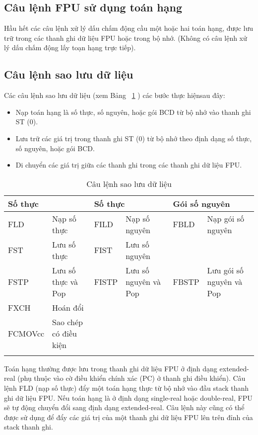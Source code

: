 		\subsection*{Câu lệnh FPU sử dụng toán hạng}
		Hầu hết các câu lệnh xử lý dấu chấm động cầu một hoặc hai toán hạng, được lưu trữ trong các thanh ghi dữ liệu FPU hoặc trong bộ nhớ. (Không có câu lệnh xử lý dấu chấm động lấy toạn hạng trực tiếp).
		
		\subsection*{ Câu lệnh sao lưu dữ liệu}
		Các câu lệnh sao lưu dữ liệu (xem Bảng ~\ref{tb:CauLenhSaoLuu} ) các bước thực hiệnsau đây:
		\begin{itemize}
			\renewcommand{\labelitemi}{\textbullet}
			\item Nạp toán hạng là số thực, số nguyên, hoặc gói BCD từ bộ nhớ vào thanh ghi ST (0).
			\item Lưu trữ các giá trị trong thanh ghi ST (0)  từ bộ nhớ theo định dạng số thực, số nguyên, hoặc gói BCD.
			\item  Di chuyển các giá trị giữa các thanh ghi trong các thanh ghi dữ liệu FPU.
		\end{itemize}		
		\begin{longtable}{|l|m{4cm}|l|m{3cm}|l|m{3cm}|}
			\hline
				\multicolumn{2}{|l|}{Số thực} & \multicolumn{2}{l|}{Số thực} & \multicolumn{2}{l|}{Gói số nguyên}\\
			\hline
			\hline
				FLD & Nạp số thực &  FILD & Nạp số nguyên &  FBLD & Nạp gói số nguyên  \\
				FST & Lưu số thực & FIST & Lưu số nguyên & & \\ 
				FSTP & Lưu số thực và Pop & FISTP & Lưu số nguyên và Pop & FBSTP  & Lưu gói số nguyên và Pop\\		    
				FXCH & Hoán đổi & & & & \\
				FCMOVcc & Sao chép có điều kiện  & & & &\\
			\hline
				\caption{Câu lệnh sao lưu dữ liệu}
				\label{tb:CauLenhSaoLuu}
		\end{longtable}
	



		Toán hạng thường được lưu trong thanh ghi dữ liệu FPU ở định dạng extended-real (phụ thuộc vào cờ điều khiển chính xác (PC) ở thanh ghi điều khiển). Câu lệnh FLD (nạp số thực) đẩy một toán hạng thực từ bộ nhớ vào đầu stack thanh ghi dữ liệu FPU. Nếu toán hạng là ở định dạng single-real hoặc double-real, FPU sẽ tự động chuyển đổi sang định dạng extended-real. Câu lệnh này cũng có thể được sử dụng để đẩy các giá trị của một thanh ghi dữ liệu FPU lên trên đỉnh của stack thanh ghi.\\
		
